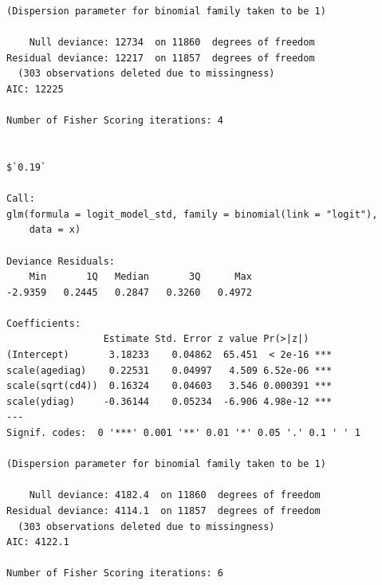 \documentclass[]{revtex4}\usepackage[]{graphicx}\usepackage[]{color}
\makeatletter
\newenvironment{kframe}{%
 \def\at@end@of@kframe{}%
 \ifinner\ifhmode%
  \def\at@end@of@kframe{\end{minipage}}%
  \begin{minipage}{\columnwidth}%
 \fi\fi%
 \def\FrameCommand##1{\hskip\@totalleftmargin \hskip-\fboxsep
 \colorbox{shadecolor}{##1}\hskip-\fboxsep
     \hskip-\linewidth \hskip-\@totalleftmargin \hskip\columnwidth}%
 \MakeFramed {\advance\hsize-\width
   \@totalleftmargin\z@ \linewidth\hsize
   \@setminipage}}%
 {\par\unskip\endMakeFramed%
 \at@end@of@kframe}
\newenvironment{knitrout}{}{} %
\makeatother
\begin{document}
\begin{knitrout}
\begin{kframe}
\begin{verbatim}
(Dispersion parameter for binomial family taken to be 1)

    Null deviance: 12734  on 11860  degrees of freedom
Residual deviance: 12217  on 11857  degrees of freedom
  (303 observations deleted due to missingness)
AIC: 12225

Number of Fisher Scoring iterations: 4


$`0.19`

Call:
glm(formula = logit_model_std, family = binomial(link = "logit"), 
    data = x)

Deviance Residuals: 
    Min       1Q   Median       3Q      Max  
-2.9359   0.2445   0.2847   0.3260   0.4972  

Coefficients:
                 Estimate Std. Error z value Pr(>|z|)    
(Intercept)       3.18233    0.04862  65.451  < 2e-16 ***
scale(agediag)    0.22531    0.04997   4.509 6.52e-06 ***
scale(sqrt(cd4))  0.16324    0.04603   3.546 0.000391 ***
scale(ydiag)     -0.36144    0.05234  -6.906 4.98e-12 ***
---
Signif. codes:  0 '***' 0.001 '**' 0.01 '*' 0.05 '.' 0.1 ' ' 1

(Dispersion parameter for binomial family taken to be 1)

    Null deviance: 4182.4  on 11860  degrees of freedom
Residual deviance: 4114.1  on 11857  degrees of freedom
  (303 observations deleted due to missingness)
AIC: 4122.1

Number of Fisher Scoring iterations: 6
\end{verbatim}
\end{kframe}
\end{knitrout}
\end{document}
